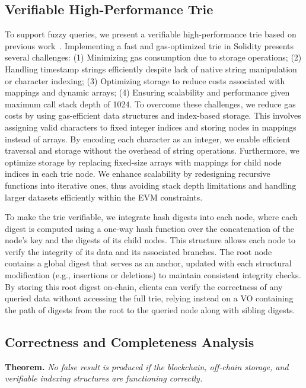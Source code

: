 \subsection{Verifiable High-Performance Trie}
\label{sec:trie}
To support fuzzy queries, we present a verifiable high-performance trie based on previous work~\cite{fredkin1960trie}. 
Implementing a fast and gas-optimized trie in Solidity presents several challenges: (1) Minimizing gas consumption due to storage operations; (2) Handling timestamp strings efficiently despite lack of native string manipulation or character indexing; (3) Optimizing storage to reduce costs associated with mappings and dynamic arrays; (4) Ensuring scalability and performance given maximum call stack depth of 1024. 
To overcome these challenges, we reduce gas costs by using gas-efficient data structures and index-based storage. 
This involves assigning valid characters to fixed integer indices and storing nodes in mappings instead of arrays.
By encoding each character as an integer, we enable efficient traversal and storage without the overhead of string operations.
Furthermore, we optimize storage by replacing fixed-size arrays with mappings for child node indices in each trie node.
We enhance scalability by redesigning recursive functions into iterative ones, thus avoiding stack depth limitations and handling larger datasets efficiently within the EVM constraints.


To make the trie verifiable, we integrate hash digests into each node, where each digest is computed using a one-way hash function over the concatenation of the node's key and the digests of its child nodes.
This structure allows each node to verify the integrity of its data and its associated branches. 
The root node contains a global digest that serves as an anchor, updated with each structural modification (e.g., insertions or deletions) to maintain consistent integrity checks. 
By storing this root digest on-chain, clients can verify the correctness of any queried data without accessing the full trie, relying instead on a VO containing the path of digests from the root to the queried node along with sibling digests.


\subsection{Correctness and Completeness Analysis}
\label{sec:CorrectnessAnalysis}
\textbf{Theorem.} \emph{No false result is produced if the blockchain, off-chain storage, and verifiable indexing structures are functioning correctly.} 


